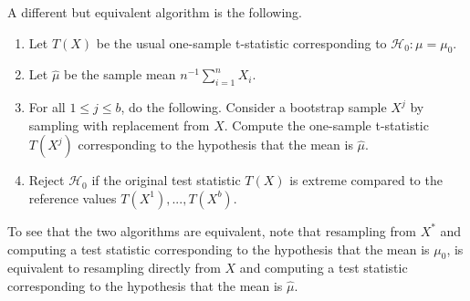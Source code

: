 \documentclass[11pt]{article}
\theoremstyle{plain}
\theoremstyle{definition}
\newcommand{\Hy}{\mathcal{H}}
\newcommand{\red}{\color{red}}
\newcommand{\black}{\color{black}}
\begin{document}

A different but equivalent algorithm is the following.
\begin{enumerate}
\item Let $T(X)$ be the usual one-sample t-statistic corresponding to  $\Hy_0:\mu=\mu_0$.
\item Let $\hat{\mu}$ be the sample mean $n^{-1}\sum_{i=1}^n X_i$.
\item For all $1\leq j \leq b$, do the following. Consider a bootstrap sample $X^j$ by sampling with replacement from $X$. Compute the one-sample t-statistic $T(X^j)$ corresponding to the hypothesis that the mean is $\hat{\mu}$.
\item Reject $\Hy_0$ if the original test statistic $T(X)$ is extreme compared to the reference values $T(X^1),...,T(X^b)$.
\end{enumerate} \phantom{.}

To see that the two algorithms are equivalent, note that resampling from $X^*$ and computing a test statistic  corresponding to the hypothesis that the mean is $\mu_0$, is equivalent to resampling directly from $X$ and computing a test statistic  corresponding to the hypothesis that the mean is $\hat{\mu}$. 
\end{document}

